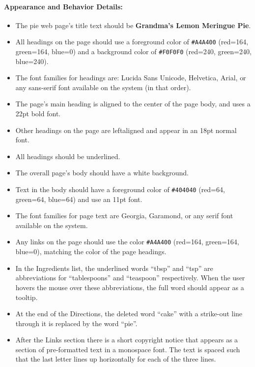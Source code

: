 \documentclass{article}
\begin{document}
\paragraph{Appearance and Behavior Details:}\mbox{}
  \begin{itemize}
    \item The pie web page's title text
      should be {\bf Grandma's Lemon Meringue Pie}.
    \item All headings on the page should use a foreground color of
      {\tt \#A4A400} (red=164, green=164, blue=0) and a background color of
      {\tt \#F0F0F0} (red=240, green=240, blue=240).
    \item The font families for headings are: Lucida Sans Unicode,
      Helvetica, Arial, or any sans-serif font available on the system
      (in that order).
    \item The page's main heading is aligned to the center of the page
      body, and uses a 22pt bold font.
    \item Other headings on the page are
      leftaligned and appear in an 18pt normal font.
    \item All headings
      should be underlined.
    \item The overall page's body should have a
      white background.
    \item Text in the body should have a foreground
      color of {\tt \#404040} (red=64, green=64, blue=64) and use an 11pt
      font.
    \item The font families for page text are Georgia, Garamond, or
      any serif font available on the system.
    \item Any links on the page
      should use the color {\tt \#A4A400} (red=164, green=164, blue=0),
      matching the color of the page headings.
    \item In the Ingredients
      list, the underlined words ``tbsp'' and ``tsp'' are abbreviations
      for ``tablespoons'' and ``teaspoon'' respectively. When the user
      hovers the mouse over these abbreviations, the full word should
      appear as a tooltip.
    \item At the end of the Directions, the deleted
      word ``cake'' with a strike-out line through it is replaced by the
      word ``pie''.
    \item After the Links section there is a short copyright
      notice that appears as a section of pre-formatted text in a
      monospace font. The text is spaced such that the last letter
      lines up horizontally for each of the three lines.

\end{itemize}
\end{document}
